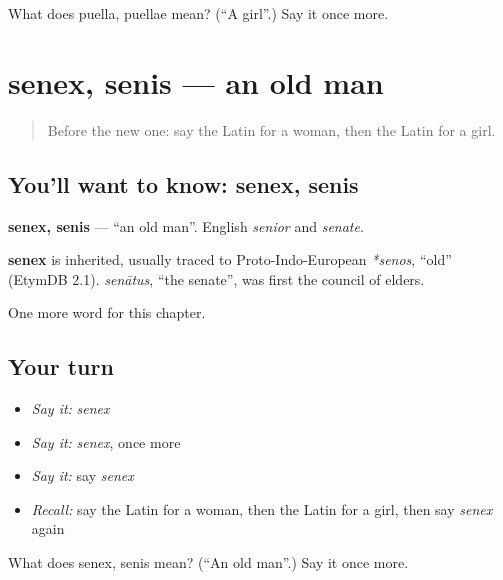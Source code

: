 \begin{tcolorbox}[breakable,colback=teal!4,colframe=teal!35!black,title={Before you move on}]
What does puella, puellae mean? (\textquotedblleft{}A girl\textquotedblright{}.) Say it once more.
\end{tcolorbox}
\section[senex, senis]{senex, senis — an old man}

\label{lesson:LA-C73-senex}



\begin{quote}
Before the new one: say the Latin for a woman, then the Latin for a girl.
\end{quote}

\subsection*{You'll want to know: senex, senis}
\textbf{senex, senis} — \textquotedblleft{}an old man\textquotedblright{}. English \emph{senior} and \emph{senate}.

\begin{cousinweb}
\textbf{senex} is inherited, usually traced to Proto-Indo-European \emph{*senos}, \textquotedblleft{}old\textquotedblright{} (EtymDB 2.1). \emph{senātus}, \textquotedblleft{}the senate\textquotedblright{}, was first the council of elders.
\end{cousinweb}

\begin{grammarlens}[title={What you've built}]
One more word for this chapter.
\end{grammarlens}

\subsection*{Your turn}
\begin{itemize}
\raggedright
  \item \emph{Say it:} \emph{senex}
  \item \emph{Say it:} \emph{senex}, once more
  \item \emph{Say it:} say \emph{senex}
  \item \emph{Recall:} say the Latin for a woman, then the Latin for a girl, then say \emph{senex} again
\end{itemize}

\begin{tcolorbox}[breakable,colback=teal!4,colframe=teal!35!black,title={Before you move on}]
What does senex, senis mean? (\textquotedblleft{}An old man\textquotedblright{}.) Say it once more.
\end{tcolorbox}
